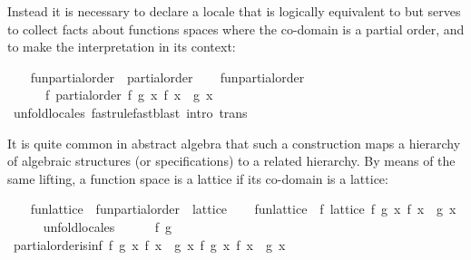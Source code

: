 \begin{isabellebody}
\begin{isamarkuptext}
  Instead it is necessary to declare a locale that is logically
  equivalent to  but serves to collect facts
  about functions spaces where the co-domain is a partial order, and
  to make the interpretation in its context:%
\end{isamarkuptext}%
\isamarkuptrue%
\ \ \isamarkupfalse%
\ fun{\isacharunderscore}partial{\isacharunderscore}order\ {\isacharequal}\ partial{\isacharunderscore}order\isanewline
\isanewline
\ \ \isamarkupfalse%
\ fun{\isacharunderscore}partial{\isacharunderscore}order\ {\isasymsubseteq}\isanewline
\ \ \ \ \ \ f{\isacharcolon}\ partial{\isacharunderscore}order\ {\isachardoublequoteopen}{\isasymlambda}f\ g{\isachardot}\ {\isasymforall}x{\isachardot}\ f\ x\ {\isasymsqsubseteq}\ g\ x{\isachardoublequoteclose}\isanewline
%
\isadelimproof
\ \ \ \ %
\endisadelimproof
%
\isatagproof
{}\isamarkupfalse%
\ unfold{\isacharunderscore}locales\ {\isacharparenleft}fast{\isacharcomma}rule{\isacharcomma}fast{\isacharcomma}blast\ intro{\isacharcolon}\ trans{\isacharparenright}%
\endisatagproof
{\isafoldproof}%
%
\isadelimproof
%
\endisadelimproof
%
\begin{isamarkuptext}%
It is quite common in abstract algebra that such a construction
  maps a hierarchy of algebraic structures (or specifications) to a
  related hierarchy.  By means of the same lifting, a function space
  is a lattice if its co-domain is a lattice:%
\end{isamarkuptext}%
\isamarkuptrue%
\ \ \isamarkupfalse%
\ fun{\isacharunderscore}lattice\ {\isacharequal}\ fun{\isacharunderscore}partial{\isacharunderscore}order\ {\isacharplus}\ lattice\isanewline
\isanewline
\ \ \isamarkupfalse%
\ fun{\isacharunderscore}lattice\ {\isasymsubseteq}\ f{\isacharcolon}\ lattice\ {\isachardoublequoteopen}{\isasymlambda}f\ g{\isachardot}\ {\isasymforall}x{\isachardot}\ f\ x\ {\isasymsqsubseteq}\ g\ x{\isachardoublequoteclose}\isanewline
%
\isadelimproof
\ \ \ \ %
\endisadelimproof
%
\isatagproof
{}\isamarkupfalse%
\ unfold{\isacharunderscore}locales\isanewline
\ \ \ \ \isamarkupfalse%
\ f\ g\isanewline
\ \ \ \ \isamarkupfalse%
\ {\isachardoublequoteopen}partial{\isacharunderscore}order{\isachardot}is{\isacharunderscore}inf\ {\isacharparenleft}{\isasymlambda}f\ g{\isachardot}\ {\isasymforall}x{\isachardot}\ f\ x\ {\isasymsqsubseteq}\ g\ x{\isacharparenright}\ f\ g\ {\isacharparenleft}{\isasymlambda}x{\isachardot}\ f\ x\ {\isasymsqinter}\ g\ x{\isacharparenright}{\isachardoublequoteclose}\isanewline

\end{isabellebody}
